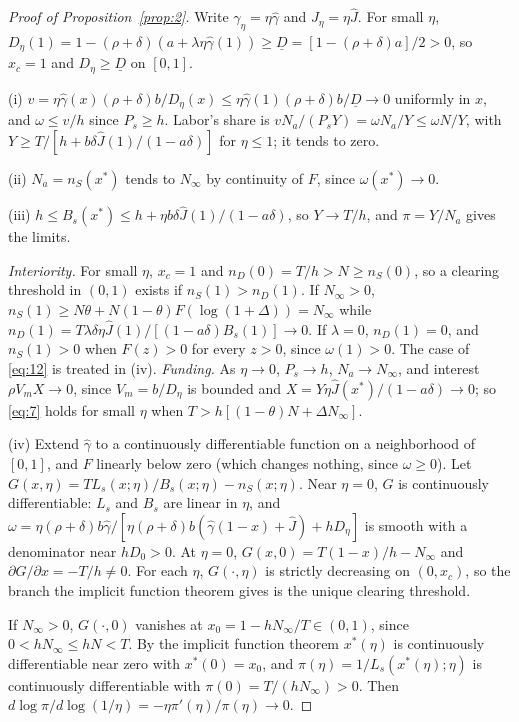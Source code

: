 \documentclass[12pt]{article}
\theoremstyle{plain}
\begin{document}
\begin{proof}[Proof of Proposition~\ref{prop:2}]
Write $\gamma_\eta=\eta\hat\gamma$ and $J_\eta=\eta\hat J$. For small $\eta$, $D_\eta(1)=1-(\rho+\delta)(a+\lambda\eta\hat\gamma(1))\ge\underline D=[1-(\rho+\delta)a]/2>0$, so $x_c=1$ and $D_\eta\ge\underline D$ on $[0,1]$.

(i) $v=\eta\hat\gamma(x)(\rho+\delta)b/D_\eta(x)\le\eta\hat\gamma(1)(\rho+\delta)b/\underline D\to0$ uniformly in $x$, and $\omega\le v/h$ since $P_s\ge h$. Labor's share is $vN_a/(P_sY)=\omega N_a/Y\le\omega N/Y$, with $Y\ge T/[h+b\delta\hat J(1)/(1-a\delta)]$ for $\eta\le1$; it tends to zero.

(ii) $N_a=n_S(x^*)$ tends to $N_\infty$ by continuity of $F$, since $\omega(x^*)\to0$.

(iii) $h\le B_s(x^*)\le h+\eta b\delta\hat J(1)/(1-a\delta)$, so $Y\to T/h$, and $\pi=Y/N_a$ gives the limits.

\emph{Interiority.} For small $\eta$, $x_c=1$ and $n_D(0)=T/h>N\ge n_S(0)$, so a clearing threshold in $(0,1)$ exists if $n_S(1)>n_D(1)$. If $N_\infty>0$, $n_S(1)\ge N\theta+N(1-\theta)F(\log(1+\Delta))=N_\infty$ while $n_D(1)=T\lambda\delta\eta\hat J(1)/[(1-a\delta)B_s(1)]\to0$. If $\lambda=0$, $n_D(1)=0$, and $n_S(1)>0$ when $F(z)>0$ for every $z>0$, since $\omega(1)>0$. The case of \eqref{eq:12} is treated in (iv). \emph{Funding.} As $\eta\to0$, $P_s\to h$, $N_a\to N_\infty$, and interest $\rho V_mX\to0$, since $V_m=b/D_\eta$ is bounded and $X=Y\eta\hat J(x^*)/(1-a\delta)\to0$; so \eqref{eq:7} holds for small $\eta$ when $T>h[(1-\theta)N+\Delta N_\infty]$.

(iv) Extend $\hat\gamma$ to a continuously differentiable function on a neighborhood of $[0,1]$, and $F$ linearly below zero (which changes nothing, since $\omega\ge0$). Let $G(x,\eta)=TL_s(x;\eta)/B_s(x;\eta)-n_S(x;\eta)$. Near $\eta=0$, $G$ is continuously differentiable: $L_s$ and $B_s$ are linear in $\eta$, and $\omega=\eta(\rho+\delta)b\hat\gamma/[\eta(\rho+\delta)b(\hat\gamma(1-x)+\hat J)+hD_\eta]$ is smooth with a denominator near $hD_0>0$. At $\eta=0$, $G(x,0)=T(1-x)/h-N_\infty$ and $\partial G/\partial x=-T/h\neq0$. For each $\eta$, $G(\cdot,\eta)$ is strictly decreasing on $(0,x_c)$, so the branch the implicit function theorem gives is the unique clearing threshold.

If $N_\infty>0$, $G(\cdot,0)$ vanishes at $x_0=1-hN_\infty/T\in(0,1)$, since $0<hN_\infty\le hN<T$. By the implicit function theorem $x^*(\eta)$ is continuously differentiable near zero with $x^*(0)=x_0$, and $\pi(\eta)=1/L_s(x^*(\eta);\eta)$ is continuously differentiable with $\pi(0)=T/(hN_\infty)>0$. Then $d\log\pi/d\log(1/\eta)=-\eta\pi'(\eta)/\pi(\eta)\to0$.


\end{proof}
\end{document}
